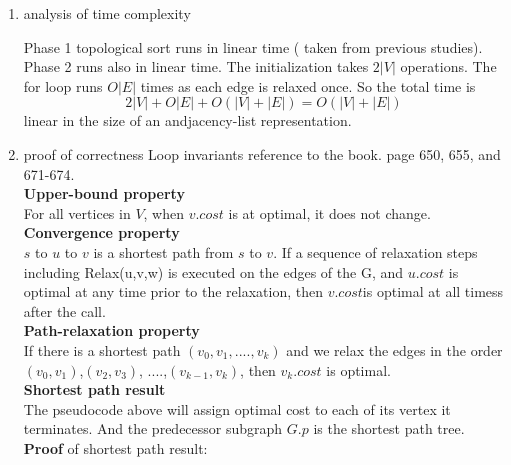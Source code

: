 \documentclass[11pt]{article}
\begin{document}
\begin{enumerate}
\begin{enumerate}
\begin{tabbing}
\end{tabbing}

\item analysis of time complexity

Phase 1 topological sort runs in linear time ( taken from previous studies). Phase 2 runs also in linear time. The initialization takes $2|V|$ operations. The for loop runs $O|E|$ times as each edge is relaxed once. So the total time is
\[2|V| + O|E| + O(|V|+|E|) = O(|V|+|E|)\] linear in the size of an andjacency-list representation.       
\item proof of correctness
Loop invariants reference to the book. page 650, 655, and 671-674. 
\\
\textbf{Upper-bound property}\\
For all vertices in $V$, when $v.cost$ is at optimal, it does not change.
\\
\textbf{Convergence property}\\
$s$ to $u$ to $v$ is a shortest path from $s$ to $v$. If a sequence of relaxation steps including Relax(u,v,w) is executed on the edges of the G, and $u.cost$ is optimal at any time prior to the relaxation, then $v.cost$is optimal at all timess after the call.
\\
\textbf{Path-relaxation property}\\
If there is a shortest path $(v_0,v_1, ....,v_k)$ and we relax the edges in the order $(v_0,v_1)$,$(v_2,v_3)$, ....,$(v_{k-1},v_k)$, then $v_k.cost$ is optimal. 
\\
\textbf{Shortest path result}\\
The pseudocode above will assign optimal cost to each of its vertex it terminates. And the predecessor subgraph $G.p$ is the shortest path tree.
\\
\textbf{Proof} of shortest path result:


\end{enumerate}
\end{enumerate}
\end{document}
